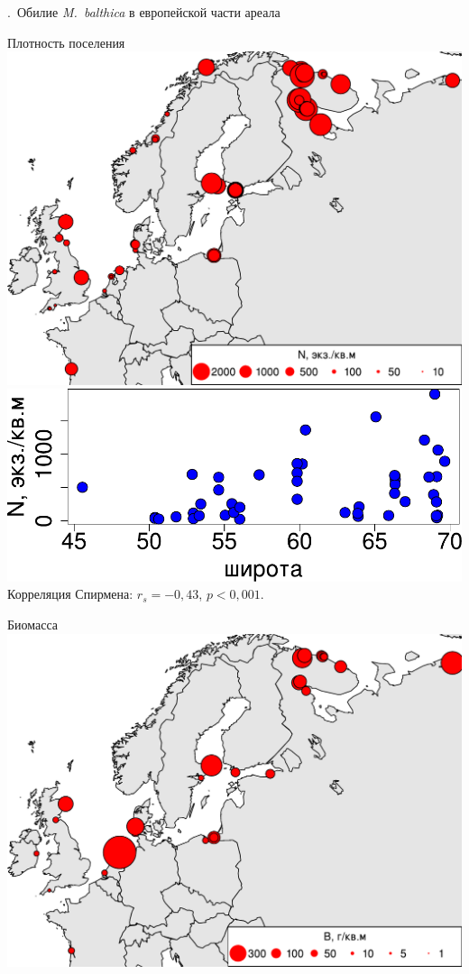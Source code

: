 \documentclass[aspectratio=169, xcolor=table]{beamer}
\begin{document}
\begin{frame}{\insertpagenumber.\ Обилие {\it M.~balthica} в европейской части ареала}
	\begin{minipage}[t]{.49\linewidth}
		\begin{center}
		{\footnotesize Плотность поселения}
			\includegraphics[width=.9\textwidth]{Nmean_ru1.pdf}\\[1ex]
			\includegraphics[width=.9\textwidth]{lat_vs_Nmean_big1.pdf}\\
{\scriptsize Корреляция Спирмена: $r_{s} = -0,43$, $p < 0,001$.}
		\end{center}
	\end{minipage}
%
	\begin{minipage}[t]{.49\linewidth}
		\begin{center}
		{\footnotesize Биомасса}
			\includegraphics[width=.9\textwidth]{Bmean_ru1.pdf}\\[1ex]

\end{center}
\end{minipage}
\end{frame}
\end{document}
